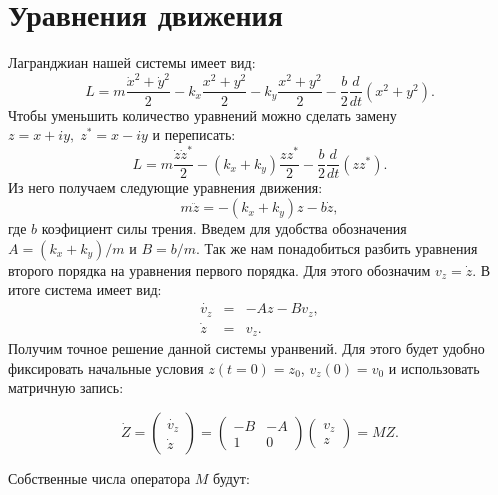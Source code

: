 \documentclass[a4paper,12pt,titlepage]{article}
\theoremstyle{definition}
\theoremstyle{theorem}
\theoremstyle{definition}
\begin{document}
\section{Уравнения движения}\label{}
Лагранджиан нашей системы имеет вид:
\begin{equation}
    L = m\frac{\dot{x}^2 + \dot{y}^2}{2} - k_x\frac{x^2 + y^2}{2}
    - k_y\frac{x^2 + y^2}{2} - \frac{b}{2}\frac{d}{dt}\left(x^2 + y^2\right). 
\end{equation}
Чтобы уменьшить количество уравнений можно сделать замену $z = x + iy, \; z^* = x - iy$ 
и переписать:
\begin{equation}
    L = m\frac{\dot{z}\dot{z}^*}{2} - \left(k_x + k_y\right)\frac{zz^*}{2} 
    - \frac{b}{2}\frac{d}{dt}\left(zz^*\right).
\end{equation}
Из него получаем следующие уравнения движения:
\begin{equation}
    m\ddot{z} =  - \left(k_x + k_y\right)z - b\dot{z},
\end{equation}
где $b$ коэфициент силы трения.
Введем для удобства обозначения $A = (k_x + k_y)/m$ и 
$B = b / m$. Так же нам понадобиться разбить уравнения второго порядка 
на уравнения первого порядка. Для этого обозначим $v_z = \dot{z}$.
В итоге система имеет вид:
\begin{eqnarray}
    \dot{v_z} &=& -Az - Bv_z,\\
    \dot{z} &=& v_z.
\end{eqnarray}
Получим точное решение данной системы уранвений. Для этого будет удобно
фиксировать начальные условия $z(t = 0) = z_0$, $v_z(0) = v_0$ и использовать
матричную запись:
\begin{spacing}{1}
    \begin{equation}\label{matr}
        \dot{Z} = 
        \begin{pmatrix}
            \dot{v_z}\\
            \dot{z}
        \end{pmatrix}
        = 
        \begin{pmatrix}
            -B & -A \\
            1 & 0
        \end{pmatrix}
        \begin{pmatrix}
            v_z\\
            z
        \end{pmatrix}
        = MZ.
    \end{equation}
\end{spacing}
Собственные числа оператора $M$ будут:
\end{document}
